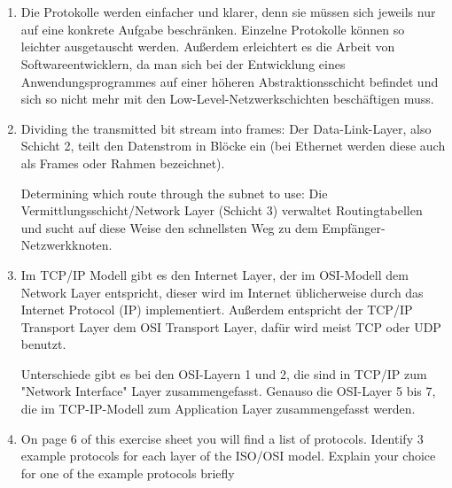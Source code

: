 \documentclass[a4paper,
			llpt,
			solution,
			accentcolor=tud2d,
			colorbacktitle
			]
			{tudexercise}
\begin{document}
\section{}
\begin{enumerate}
\item
Die Protokolle werden einfacher und klarer, denn sie müssen sich jeweils nur auf eine konkrete Aufgabe beschränken.
Einzelne Protokolle können so leichter ausgetauscht werden.
Außerdem erleichtert es die Arbeit von Softwareentwicklern,
da man sich bei der Entwicklung eines Anwendungsprogrammes
auf einer höheren Abstraktionsschicht befindet
und sich so nicht mehr mit den Low-Level-Netzwerkschichten beschäftigen muss.

\item
Dividing the transmitted bit stream into frames:
Der Data-Link-Layer, also Schicht 2, teilt den Datenstrom in Blöcke ein (bei Ethernet
werden diese auch als Frames oder Rahmen bezeichnet).

Determining which route through the subnet to use:
Die Vermittlungsschicht/Network Layer (Schicht 3) verwaltet Routingtabellen und sucht
auf diese Weise den schnellsten Weg zu dem Empfänger-Netzwerkknoten.

\item
Im TCP/IP Modell gibt es den Internet Layer, der im OSI-Modell dem Network Layer
entspricht, dieser wird im Internet üblicherweise durch das Internet Protocol (IP) implementiert.
Außerdem entspricht der TCP/IP Transport Layer dem OSI Transport Layer, dafür wird meist TCP oder UDP benutzt.

Unterschiede gibt es bei den OSI-Layern 1 und 2, die sind in TCP/IP zum "Network Interface" Layer zusammengefasst. Genauso die OSI-Layer 5 bis 7, die im TCP-IP-Modell zum Application Layer zusammengefasst werden.
\item
On page 6 of this exercise sheet you will find a list of protocols. Identify 3 example protocols for each layer of the ISO/OSI model. Explain your choice for one of the example protocols briefly

\end{enumerate}
\end{document}
